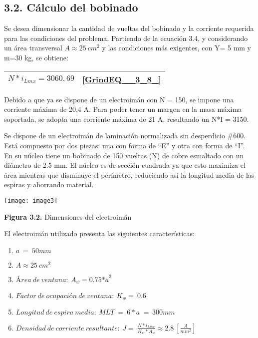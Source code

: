 \documentclass{article} %
\begin{document}
\noindent 
\subsection{3.2. C\'{a}lculo del bobinado}

\noindent 

\noindent Se desea dimensionar la cantidad de vueltas del bobinado y la corriente requerida para las condiciones del problema. Partiendo de la ecuaci\'{o}n 3.4, y considerando un \'{a}rea transversal $A\approx 25\ {cm}^2$  y las condiciones m\'{a}s exigentes, con Y= 5 mm y m=30 kg, se obtiene:

\noindent 

\begin{tabular}{|p{3.9in}|p{0.4in}|} \hline 
$N*i_{Lmx}=3060,69$ & \eqref{GrindEQ__3_8_}  \\ \hline 
\end{tabular}



\noindent Debido a que ya se dispone de un electroim\'{a}n con N = 150, se impone una corriente m\'{a}xima de 20,4 A. Para poder tener un margen en la masa m\'{a}xima soportada, se adopta una corriente m\'{a}xima de 21 A, resultando un N*I = 3150.

\noindent 

\noindent Se dispone de un electroim\'{a}n  de laminaci\'{o}n normalizada sin desperdicio \#600. Est\'{a} compuesto por dos piezas: una con forma de ``E'' y otra con forma de ``I''. En su n\'{u}cleo tiene un bobinado de 150 vueltas (N) de cobre esmaltado con un di\'{a}metro de 2.5 mm. El n\'{u}cleo es de secci\'{o}n cuadrada ya que esto maximiza el \'{a}rea mientras que disminuye el per\'{i}metro, reduciendo as\'{i} la longitud media de las espiras y ahorrando material. 

\noindent 

\noindent \texttt{[image: image3]}

\noindent \textbf{Figura 3.2. }Dimensiones del electroim\'{a}n\textbf{}

 

\noindent El electroim\'{a}n utilizado presenta las siguientes caracter\'{i}sticas:

\begin{enumerate}
\item  $a\ =\ 50mm$

\item  $A\approx 25\ {cm}^2$

\item  ${\textrm{\'{A}}rea\ de\ ventana:\ A}_w=0.75{*a}^2$

\item  $Factor\ de\ ocupaci\textrm{\'{o}}n\ de\ ventana:\ K_w=\ 0.6$

\item  $Longitud\ de\ espira\ media:\ MLT\ =\ 6*a\ =\ 300mm$

\item  $Densidad\ de\ corriente\ resultante:\ J=\ \frac{N*i_{Lmx}}{K_w*A_w}\approx 2.8\ [\frac{A}{{mm}^2}]$
\end{enumerate}
\end{document}
